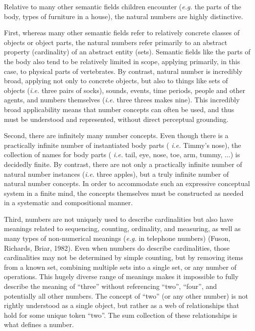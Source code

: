 \documentclass[10pt,letterpaper]{article}
\begin{document}
Relative to many other semantic fields children encounter ({\it e.g.}
the parts of the body, types of furniture in a house), the natural
numbers are highly distinctive.

First, whereas many other semantic fields refer to relatively concrete
classes of objects or object parts, the natural numbers refer
primarily to an abstract property (cardinality) of an abstract entity
(sets). Semantic fields like the parts of the body also tend to be
relatively limited in scope, applying primarily, in this case, to
physical parts of vertebrates. By contrast, natural number is
incredibly broad, applying not only to concrete objects, but also to
things like sets of objects ({\it i.e.}  three pairs of socks),
sounds, events, time periods, people and other agents, and numbers
themselves ({\it i.e.}  three threes makes nine). This incredibly
broad applicability means that number concepts can often be used, and
thus must be understood and represented, without direct perceptual
grounding.

Second, there are infinitely many number concepts. Even though there
is a practically infinite number of instantiated body parts ({\it
  i.e.} Timmy's nose), the collection of names for body parts ({\it
  i.e.} tail, eye, nose, toe, arm, tummy, ...) is decidedly finite. By
contrast, there are not only a practically infinite number of natural
number instances ({\it i.e.}  three apples), but a truly infinite
number of natural number concepts. In order to accommodate such an
expressive conceptual system in a finite mind, the concepts themselves
must be constructed as needed in a systematic and compositional
manner.

Third, numbers are not uniquely used to describe cardinalities but
also have meanings related to sequencing, counting, ordinality, and
measuring, as well as many types of non-numerical meanings ({\it e.g.}
in telephone numbers) (Fuson, Richards, Briar, 1982). Even when
numbers do describe cardinalities, those cardinalities may not be
determined by simple counting, but by removing items from a known set,
combining multiple sets into a single set, or any number of
operations. This hugely diverse range of meanings makes it impossible
to fully describe the meaning of ``three'' without referencing
``two'', ``four'', and potentially all other numbers. The concept of
``two'' (or any other number) is not rightly understood as a single
object, but rather as a web of relationships that hold for some unique
token ``two''. The sum collection of these relationships is what
defines a number.
\end{document}
